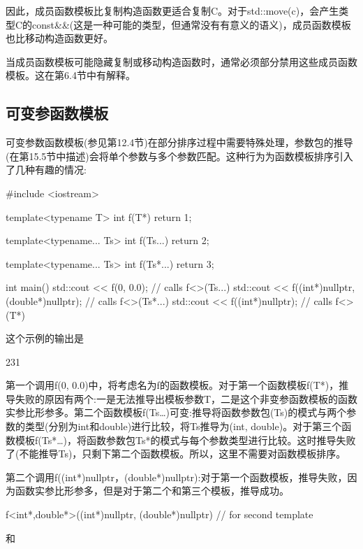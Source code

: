 因此，成员函数模板比复制构造函数更适合复制C。对于std::move(c)，会产生类型C的const\&\&(这是一种可能的类型，但通常没有有意义的语义)，成员函数模板也比移动构造函数更好。

当成员函数模板可能隐藏复制或移动构造函数时，通常必须部分禁用这些成员函数模板。这在第6.4节中有解释。

\subsection{可变参函数模板}

可变参数函数模板(参见第12.4节)在部分排序过程中需要特殊处理，参数包的推导(在第15.5节中描述)会将单个参数与多个参数匹配。这种行为为函数模板排序引入了几种有趣的情况:

\begin{cpp}
#include <iostream>

template<typename T>
int f(T*)
{
	return 1;
}

template<typename... Ts>
int f(Ts...)
{
	return 2;
}

template<typename... Ts>
int f(Ts*...)
{
	return 3;
}

int main()
{
	std::cout << f(0, 0.0); // calls f<>(Ts...)
	std::cout << f((int*)nullptr, (double*)nullptr); // calls f<>(Ts*...)
	std::cout << f((int*)nullptr); // calls f<>(T*)
}
\end{cpp}

这个示例的输出是

\begin{shell}
231
\end{shell}

第一个调用f(0, 0.0)中，将考虑名为f的函数模板。对于第一个函数模板f(T*)，推导失败的原因有两个:一是无法推导出模板参数T，二是这个非变参函数模板的函数实参比形参多。第二个函数模板f(Ts…)可变:推导将函数参数包(Ts)的模式与两个参数的类型(分别为int和double)进行比较，将Ts推导为(int, double)。对于第三个函数模板f(Ts*…)，将函数参数包Ts*的模式与每个参数类型进行比较。这时推导失败了(不能推导Ts)，只剩下第二个函数模板。所以，这里不需要对函数模板排序。

第二个调用f((int*)nullptr，(double*)nullptr):对于第一个函数模板，推导失败，因为函数实参比形参多，但是对于第二个和第三个模板，推导成功。

\begin{cpp}
f<int*,double*>((int*)nullptr, (double*)nullptr) // for second template
\end{cpp}

和

